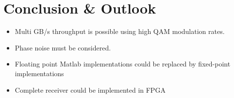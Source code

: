 \chapter{Conclusion \& Outlook}

\begin{itemize}
\item Multi GB/s throughput is possible using high QAM modulation rates.
\item Phase noise must be considered.
\item Floating point Matlab implementations could be replaced by fixed-point implementations
\item Complete receiver could be implemented in FPGA
\end{itemize}
